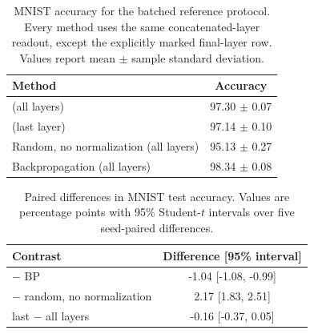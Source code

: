 \begin{table}[H]
\centering
\caption{MNIST accuracy for the batched reference protocol. Every method uses the same concatenated-layer readout, except the explicitly marked final-layer row. Values report mean $\pm$ sample standard deviation.}
\label{tab:mnist-primary}
\begin{tabular}{lc}
\toprule
Method & Accuracy \\
\midrule
\TeReLOffline{} (all layers) & 97.30 $\pm$ 0.07 \\
\TeReLOffline{} (last layer) & 97.14 $\pm$ 0.10 \\
Random, no normalization (all layers) & 95.13 $\pm$ 0.27 \\
Backpropagation (all layers) & 98.34 $\pm$ 0.08 \\
\bottomrule
\end{tabular}
\end{table}

\begin{table}[H]
\centering
\caption{Paired differences in MNIST test accuracy. Values are percentage points with 95\% Student-$t$ intervals over five seed-paired differences.}
\label{tab:mnist-contrasts}
\begin{tabular}{lc}
\toprule
Contrast & Difference [95\% interval] \\
\midrule
\TeReLOffline{} $-$ BP & -1.04 [-1.08, -0.99] \\
\TeReLOffline{} $-$ random, no normalization & 2.17 [1.83, 2.51] \\
last $-$ all layers & -0.16 [-0.37, 0.05] \\
\bottomrule
\end{tabular}
\end{table}
